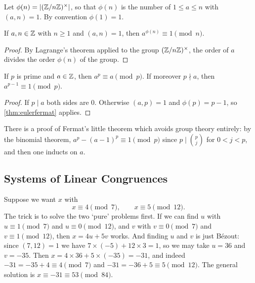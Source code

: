 \documentclass[a4paper]{scrartcl}
\begin{document}
\begin{definition}
	Let $\phi(n) = |(\mathbb{Z}/n\mathbb{Z})^\times|$, so that $\phi(n)$ is the number of $1 \leq a \leq n$ with $(a, n) = 1$. By convention $\phi(1) = 1$.
\end{definition}

\begin{theorem}\label{thm:eulerfermat}
	If $a, n \in \mathbb{Z}$ with $n \geq 1$ and $(a, n) = 1$, then $a^{\phi(n)} \equiv 1 \pmod n$.
\end{theorem}
\begin{proof}
	By Lagrange's theorem applied to the group $(\mathbb{Z}/n\mathbb{Z})^\times$, the order of $a$ divides the order $\phi(n)$ of the group.
\end{proof}

\begin{theorem}\label{thm:flt}
	If $p$ is prime and $a \in \mathbb{Z}$, then $a^p \equiv a \pmod p$. If moreover $p \nmid a$, then $a^{p-1} \equiv 1 \pmod p$.
\end{theorem}
\begin{proof}
	If $p \mid a$ both sides are $0$. Otherwise $(a, p) = 1$ and $\phi(p) = p - 1$, so \autoref{thm:eulerfermat} applies.
\end{proof}

\begin{remark}
	There is a proof of Fermat's little theorem which avoids group theory entirely: by the binomial theorem, $a^p - (a-1)^p \equiv 1 \pmod p$ since $p \mid \binom{p}{j}$ for $0 < j < p$, and then one inducts on $a$.
\end{remark}

\subsection{Systems of Linear Congruences}

Suppose we want $x$ with
$$
x \equiv 4 \pmod 7, \qquad x \equiv 5 \pmod{12}.
$$
The trick is to solve the two `pure' problems first. If we can find $u$ with $u \equiv 1 \pmod 7$ and $u \equiv 0 \pmod{12}$, and $v$ with $v \equiv 0 \pmod 7$ and $v \equiv 1 \pmod{12}$, then $x = 4u + 5v$ works. And finding $u$ and $v$ is just Bézout: since $(7, 12) = 1$ we have $7 \times (-5) + 12 \times 3 = 1$, so we may take $u = 36$ and $v = -35$. Then $x = 4 \times 36 + 5 \times (-35) = -31$, and indeed $-31 = -35 + 4 \equiv 4 \pmod 7$ and $-31 = -36 + 5 \equiv 5 \pmod{12}$. The general solution is $x \equiv -31 \equiv 53 \pmod{84}$.
\end{document}

